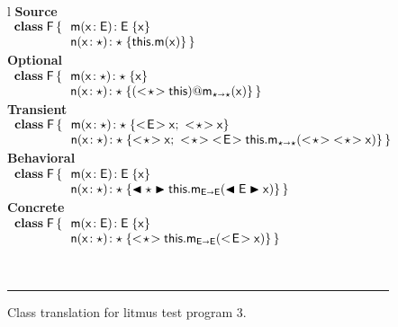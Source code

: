 \documentclass[a4paper,USenglish]{tex/lipics-v2016}
\begin{document}
\begin{figure}[!h]
\hrulefill\\
  \begin{tabular}{l}
    {\scriptsize\bf{Source}} \\
\(
\begin{array}{l@{\,}l}
\Class{\xt F}{}{&\Mdef\m\x{\xt E}{\xt E}\x \\
                &\Mdef\n\x\any\any{\Call\this\m\x}} \\
\end{array}
\) \\
    {\scriptsize\bf{Optional}} \\ 
\(
\begin{array}{l@{\,}l}
\Class{\xt F}{}{&\Mdef\m\x{\any}{\any}\x \\
                &\Mdef\n\x\any\any{\DynCall{(\SubCast\any\this)}\m\x}} \\
\end{array}
\) \\
    {\scriptsize\bf{Transient}} \\
\(
\begin{array}{l@{\,}l}
\Class{\xt F}{}{&\Mdef\m\x\any\any{\SubCast{\xt E}{\x}; ~ \SubCast{\any}{\x} } \\
                &\Mdef\n\x\any\any{\SubCast{\any}{\x}\sspce 
                \SubCast{\any}{\SubCast{\xt E}{\KCall\this\m{\SubCast\any{\SubCast\any\x}}\any\any}}}} \\
\end{array}
\)\\
    {\scriptsize\bf{Behavioral}} \\
\(
\begin{array}{l@{\,}l}
\Class{\xt F}{}{&\Mdef\m\x{\xt E}{\xt E}\x \\
                &\Mdef\n\x\any\any{\BehCast\any{\KCall\this\m{\BehCast{\xt E}\x}{\xt E}{\xt E}}}} \\
\end{array}
\) \\
    {\scriptsize\bf{Concrete}} \\
\(
\begin{array}{l@{\,}l}
\Class{\xt F}{}{&\Mdef\m\x{\xt E}{\xt E}\x \\
                &\Mdef\n\x\any\any{\SubCast\any{\KCall\this\m{\SubCast{\xt E}\x}{\xt E}{\xt E}}}} \\
\end{array}
\) \\
  \end{tabular}\vspace{2mm}\\
\hrule\vspace{4mm}

 \caption{Class translation for litmus test program 3.} \label{fig:l3trans}
\end{figure}
\end{document}
